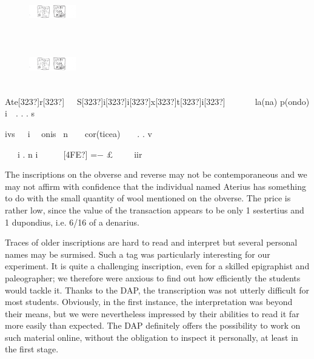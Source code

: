 \documentclass[amsthm,ebook]{saparticle}
\begin{document}
\begin{figure}
\centering
\includegraphics[width=2.044cm,height=1.794cm]{EAGLE16lameetalteaching-img005.png}
\end{figure}
\begin{figure}
\centering
\includegraphics[width=2.044cm,height=1.794cm]{EAGLE16lameetalteaching-img005.png}
\end{figure}
Ate[323?]r[323?]\ \  \ S[323?]i[323?]i[323?]x[323?]t[323?]i[323?]\ \  \ \ \ \ \ la(na) p(ondo) i\ \ . . . s

ivs\ \  \ i \ \ onis \ n\ \ \ \ cor(ticea)\ \ \ \ . . v\ \ 

\ \  \ i . n i\ \ \ \ \ \ [4FE?] =$-$ £\ \ \ \  \ iir

The inscriptions on the obverse and reverse may not be contemporaneous and we may not affirm with confidence that the
individual named Aterius has something to do with the small quantity of wool mentioned on the obverse. The price is
rather low, since the value of the transaction appears to be only 1 sestertius and 1 dupondius, i.e. 6/16 of a
denarius. 

Traces of older inscriptions are hard to read and interpret but several personal names may be surmised. Such a tag was
particularly interesting for our experiment. It is quite a challenging inscription, even for a skilled epigraphist and
paleographer; we therefore were anxious to find out how efficiently the students would tackle it. Thanks to the DAP,
the transcription was not utterly difficult for most students. Obviously, in the first instance, the interpretation was
beyond their means, but we were nevertheless impressed by their abilities to read it far more easily than expected. The
DAP definitely offers the possibility to work on such material online, without the obligation to inspect it personally,
at least in the first stage.
\end{document}
